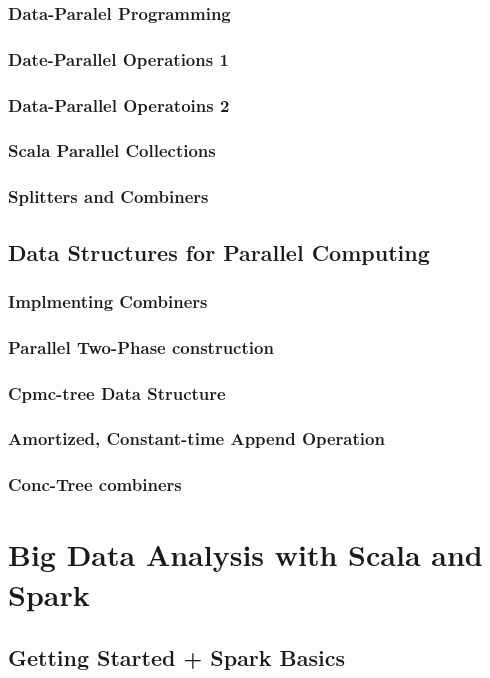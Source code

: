 \documentclass[10pt, a4paper]{report}
\begin{document}
\section{Data-Paralel Programming}
\section{Date-Parallel Operations 1}
\section{Data-Parallel Operatoins 2}
\section{Scala Parallel Collections}
\section{Splitters and Combiners}

\chapter{Data Structures for Parallel Computing}

\section{Implmenting Combiners}
\section{Parallel Two-Phase construction}
\section{Cpmc-tree Data Structure}
\section{Amortized, Constant-time Append Operation}
\section{Conc-Tree combiners}



\part{Big Data Analysis with Scala and Spark}
\chapter{Getting Started + Spark Basics}
\end{document}
